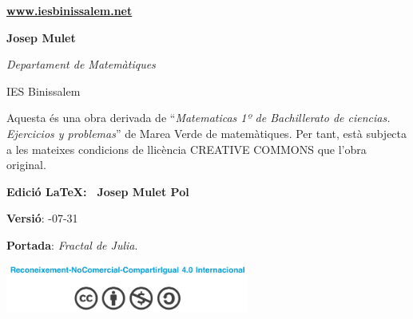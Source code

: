 \begin{center}
\begin{minipage}{0.4\textwidth}
\begin{center}
			\small
			
			\noindent \href{www.iesbinissalem.net}{\textbf{www.iesbinissalem.net}}  
			
		\end{center}
	\end{minipage}
	\begin{minipage}{0.4\textwidth}
		\begin{flushright}
			\textbf{Josep Mulet}
			
			\textit{Departament de Matemàtiques} 
			
			IES Binissalem
		\end{flushright}
	\end{minipage} 
	
	
\end{center}

\newpage

\vspace*{12.9cm}
\begin{center}
	\begin{minipage}{0.5\textwidth}
		Aquesta és una obra derivada de ``\textit{Matematicas 1º de Bachillerato de ciencias. Ejercicios y problemas}'' de Marea Verde de matemàtiques. Per tant, està subjecta a les mateixes condicions de llicència CREATIVE COMMONS que l'obra original.
		
		\noindent \textbf{Edició \LaTeX: \quad \textregistered \,  Josep Mulet Pol}
		
		\noindent \textbf{Versió}: -07-31
		
		\noindent \textbf{Portada}: \quad \textit{Fractal de Julia}.
		
		
		\begin{center}
			\includegraphics*[width=8cm]{img-00/licencia}
		\end{center}
	\end{minipage}
\end{center}



\newpage


\renewcommand{\thepage}{\Roman{page}}%
\pagestyle{myheadings}
\thispagestyle{empty}
\renewcommand{\headrulewidth}{0pt}
\renewcommand{\footrulewidth}{0pt}

